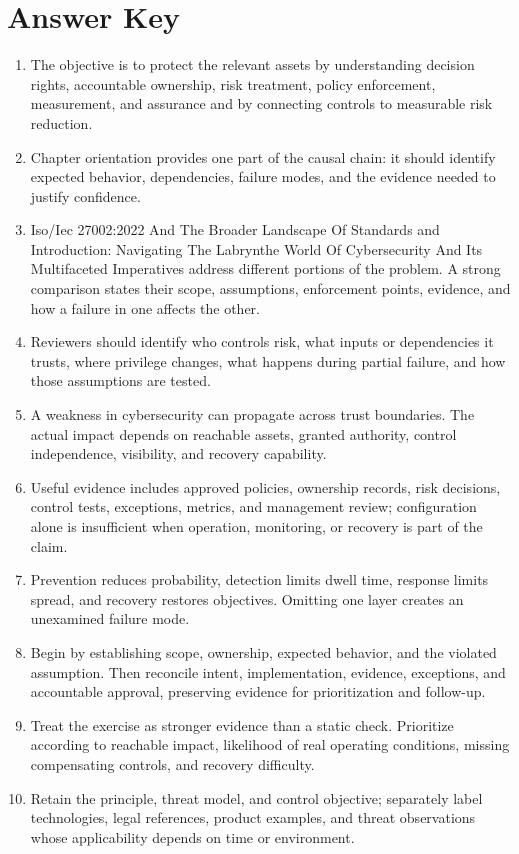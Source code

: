 \documentclass[11pt,letterpaper]{article}
\begin{document}
\section*{Answer Key}
\begin{enumerate}
\item The objective is to protect the relevant assets by understanding decision rights, accountable ownership, risk treatment, policy enforcement, measurement, and assurance and by connecting controls to measurable risk reduction.
\item Chapter orientation provides one part of the causal chain: it should identify expected behavior, dependencies, failure modes, and the evidence needed to justify confidence.
\item Iso/Iec 27002:2022 And The Broader Landscape Of Standards and Introduction: Navigating The Labrynthe World Of Cybersecurity And Its Multifaceted Imperatives address different portions of the problem. A strong comparison states their scope, assumptions, enforcement points, evidence, and how a failure in one affects the other.
\item Reviewers should identify who controls risk, what inputs or dependencies it trusts, where privilege changes, what happens during partial failure, and how those assumptions are tested.
\item A weakness in cybersecurity can propagate across trust boundaries. The actual impact depends on reachable assets, granted authority, control independence, visibility, and recovery capability.
\item Useful evidence includes approved policies, ownership records, risk decisions, control tests, exceptions, metrics, and management review; configuration alone is insufficient when operation, monitoring, or recovery is part of the claim.
\item Prevention reduces probability, detection limits dwell time, response limits spread, and recovery restores objectives. Omitting one layer creates an unexamined failure mode.
\item Begin by establishing scope, ownership, expected behavior, and the violated assumption. Then reconcile intent, implementation, evidence, exceptions, and accountable approval, preserving evidence for prioritization and follow-up.
\item Treat the exercise as stronger evidence than a static check. Prioritize according to reachable impact, likelihood of real operating conditions, missing compensating controls, and recovery difficulty.
\item Retain the principle, threat model, and control objective; separately label technologies, legal references, product examples, and threat observations whose applicability depends on time or environment.
\end{enumerate}
\end{document}

